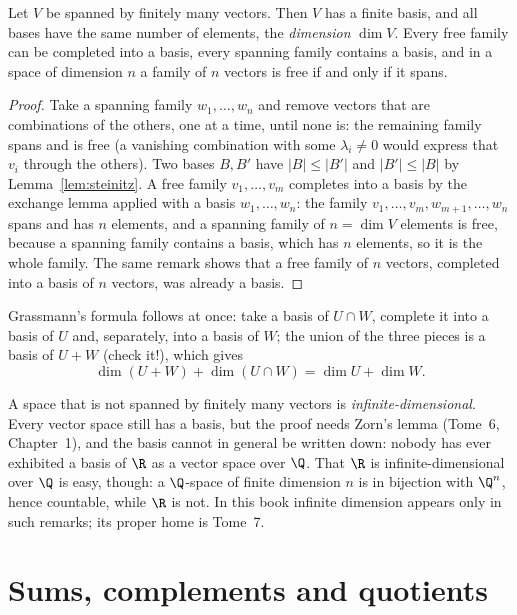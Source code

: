 \begin{theorem}[dimension]\label{thm:dim}
Let $V$ be spanned by finitely many vectors. Then $V$ has a finite basis, and all bases have the same number of elements,
the \emph{dimension} $\dim V$. Every free family can be completed into a basis, every spanning family contains a basis,
and in a space of dimension $n$ a family of $n$ vectors is free if and only if it spans.
\end{theorem}
\begin{proof}
Take a spanning family $w_1,\dots,w_n$ and remove vectors that are combinations of the others, one at a time, until none
is: the remaining family spans and is free (a vanishing combination with some $\lambda_i\ne0$ would express that $v_i$
through the others). Two bases $B,B'$ have $|B|\le|B'|$ and $|B'|\le|B|$ by Lemma~\ref{lem:steinitz}. A free family
$v_1,\dots,v_m$ completes into a basis by the exchange lemma applied with a basis $w_1,\dots,w_n$: the family
$v_1,\dots,v_m,w_{m+1},\dots,w_n$ spans and has $n$ elements, and a spanning family of $n=\dim V$ elements is free,
because a spanning family contains a basis, which has $n$ elements, so it is the whole family. The same remark shows that
a free family of $n$ vectors, completed into a basis of $n$ vectors, was already a basis.
\end{proof}

Grassmann's formula follows at once: take a basis of $U\cap W$, complete it into a basis of $U$ and, separately, into a
basis of $W$; the union of the three pieces is a basis of $U+W$ (check it!), which gives
\[
\dim(U+W)+\dim(U\cap W)=\dim U+\dim W.
\]

\begin{remark}
A space that is not spanned by finitely many vectors is \emph{infinite-dimensional}. Every vector space still has a
basis, but the proof needs Zorn's lemma (Tome~6, Chapter~1), and the basis cannot in general be written down: nobody
has ever exhibited a basis of $\R$ as a vector space over $\Q$. That $\R$ is infinite-dimensional over $\Q$ is easy,
though: a $\Q$-space of finite dimension $n$ is in bijection with $\Q^n$, hence countable, while $\R$ is not. In this
book infinite dimension appears only in such remarks; its proper home is Tome~7.
\end{remark}

\section{Sums, complements and quotients}\label{sec:quotients}


